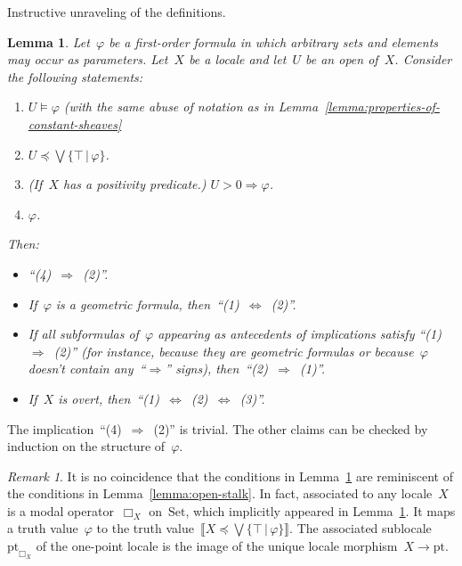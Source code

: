 \documentclass[10pt,reqno,a4paper]{amsbook}
\makeatletter
\theoremstyle{definition}
\theoremstyle{plain}
\newtheorem{lemma}[defn]{Lemma}
\theoremstyle{remark}
\newtheorem{rem}[defn]{Remark}
\newcommand{\Set}{\mathrm{Set}}
\newcommand{\pt}{\mathrm{pt}}
\newcommand{\?}{\,{:}\,}
\renewcommand{\_}{\mathpunct{.}\,}
\newcommand{\brak}[1]{{\llbracket{#1}\rrbracket}}
\renewenvironment{proof}[1][\proofname]{\par
  \pushQED{\qed}%
  \normalfont \topsep6\p@\@plus6\p@\relax
  \trivlist
  \item[\hskip\labelsep
        \itshape
    #1\@addpunct{.}]\ignorespaces
}{%
  \popQED\endtrivlist\@endpefalse
}
\makeatother
\begin{document}
{\begin{proof}Instructive unraveling of the definitions.
\end{proof}

\begin{lemma}\label{lemma:properties-of-constant-sheaves-over-locales}
Let~$\varphi$ be a first-order formula in which arbitrary sets and elements may
occur as parameters. Let~$X$ be a locale and let~$U$ be an open of~$X$.
Consider the following statements:
\begin{enumerate}
\item $U \models \varphi$ (with the same abuse of notation as in
Lemma~\ref{lemma:properties-of-constant-sheaves}
\item $U \preceq \bigvee \{ \top \,|\, \varphi \}$.
\item (If~$X$ has a positivity predicate.) $U > 0 \Longrightarrow \varphi$.
\item $\varphi$.
\end{enumerate}
Then:
\begin{itemize}
\item ``(4)~$\Rightarrow$~(2)''.
\item If~$\varphi$ is a geometric formula, then~``(1)~$\Leftrightarrow$~(2)''.
\item If all subformulas of~$\varphi$ appearing as antecedents of implications
satisfy ``(1)~$\Rightarrow$~(2)'' (for instance, because they are geometric
formulas or because~$\varphi$ doesn't contain any~``$\Rightarrow$'' signs),
then~``(2)~$\Rightarrow$~(1)''.
\item If~$X$ is overt, then~``(1)~$\Leftrightarrow$~(2)~$\Leftrightarrow$~(3)''.
\end{itemize}
\end{lemma}

\begin{proof}The implication~``(4)~$\Rightarrow$~(2)'' is trivial. The other
claims can be checked by induction on the structure of~$\varphi$.
\end{proof}

\begin{rem}It is no coincidence that the conditions in
Lemma~\ref{lemma:properties-of-constant-sheaves-over-locales} are reminiscent
of the conditions in Lemma~\ref{lemma:open-stalk}. In fact, associated to any
locale~$X$ is a modal operator~$\Box_X$ on~$\Set$, which implicitly appeared in
Lemma~\ref{lemma:properties-of-constant-sheaves-over-locales}. It maps a truth
value~$\varphi$ to the truth value~$\brak{X \preceq
\bigvee\{\top\,|\,\varphi\}}$. The associated sublocale~$\pt_{\Box_X}$ of the
one-point locale is the image of the unique locale morphism~$X \to \pt$.\end{rem}

}
\end{document}
